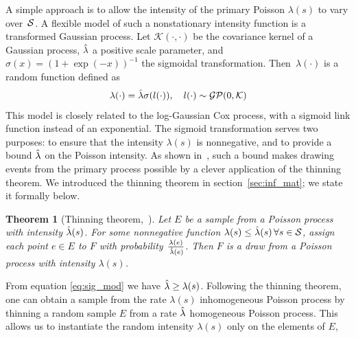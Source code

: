 \documentclass{statsoc}
\newtheorem{thrm}[defn]{Theorem}
\begin{document}
A simple approach is %
to allow the intensity of the primary Poisson $\lambda(s)$ to vary over~${\mathcal S}$. %
A flexible model of such a nonstationary intensity function is a transformed Gaussian process.
Let $\mathcal{K}(\cdot,\cdot)$ be the %
covariance kernel of a Gaussian process, $\hat{\lambda}$ a positive scale parameter, and 
$\sigma(x)=(1+\exp(-x))^{-1}$ the sigmoidal transformation. Then~$\lambda(\cdot)$ is a random function defined as
  \begin{align}
    \lambda(\cdot) = \hat{\lambda} \sigma(l(\cdot)), \quad
    l(\cdot) \sim \mathcal{GP}(0,\mathcal{K})\label{eq:sig_mod}
  \end{align}
  This model is closely related to the log-Gaussian Cox process, with a sigmoid link function instead of an exponential.
The sigmoid transformation serves two purposes: to ensure that the intensity $\lambda(s)$ is nonnegative, and
to provide a bound $\hat{\lambda}$ on the Poisson intensity. As shown in~\cite{adams-murray-mackay-2009b}, such a bound makes drawing events from the 
primary process possible by a %
clever application of the thinning theorem. %
We introduced the thinning theorem in section~\ref{sec:inf_mat}; we state it formally below.
\begin{thrm}[Thinning theorem,~\cite{Lewis1979}]
 Let $E$ be a sample from a Poisson process with intensity $\hat{\lambda}(s)$.
For some nonnegative function ${\lambda(s) \le \hat{\lambda}(s) \, \forall s \in {\mathcal S}}$, assign each
point $e \in E$ to $F$ with probability $\frac{\lambda(e)}{\, \hat{\lambda}(e)}$.
 Then $F$ is a draw from a Poisson process with intensity $\lambda(s)$. \label{thrm:Thin}
\end{thrm}
From equation \eqref{eq:sig_mod} we have ${\hat{\lambda} \ge \lambda(s)}$. Following the thinning theorem, 
one can obtain a sample from the rate $\lambda(s)$ inhomogeneous Poisson process by thinning a random sample $E$ from a rate $\hat{\lambda}$ homogeneous
Poisson process. This allows us to instantiate the random intensity $\lambda(s)$ only on the elements of $E$,
\end{document}
